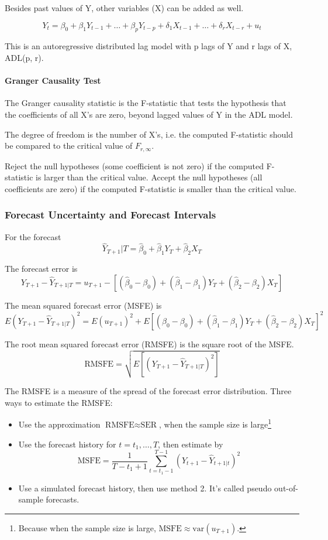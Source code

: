 \documentclass{article}
\begin{document}
Besides past values of Y, other variables (X) can be added as well.

\[
	Y_t = \beta_0 + \beta_1 Y_{t-1} + \ldots + \beta_p Y_{t-p} + \delta_1 X_{t-1} + \ldots + \delta_r X_{t-r} + u_t
\]

This is an autoregressive distributed lag model with p lags of Y and r lags of X, ADL(p, r).

\paragraph{Granger Causality Test}

The Granger causality statistic is the F-statistic that tests the hypothesis that the coefficients of all X's are zero,
beyond lagged values of Y in the ADL model.

The degree of freedom is the number of X's,
i.e. the computed F-statistic should be compared to the critical value of $F_{r, \infty}$.

Reject the null hypotheses (some coefficient is not zero) if the computed F-statistic is larger than the critical value.
Accept the null hypotheses (all coefficients are zero) if the computed F-statistic is smaller than the critical value.

\subsubsection{Forecast Uncertainty and Forecast Intervals}

For the forecast
\[
	\hat{Y}_{T+1}|T = \hat{\beta}_0 + \hat{\beta}_1 Y_T + \hat{\beta}_2 X_T
\]

The forecast error is
\[
	Y_{T+1} - \hat{Y}_{T+1|T} = u_{T+1} - \left[
		(\hat\beta_0 - \beta_0) + (\hat\beta_1 - \beta_1) Y_T + (\hat\beta_2 -\beta_2) X_T
	\right]
\]

The mean squared forecast error (MSFE) is
\[
	E(Y_{T+1} - \hat{Y}_{T+1|T})^2 = E(u_{T+1})^2 + E\left[
		(\hat\beta_0 - \beta_0) + (\hat\beta_1 - \beta_1) Y_T + (\hat\beta_2 -\beta_2) X_T
	\right]^2
\]



The root mean squared forecast error (RMSFE) is the square root of the MSFE.
\[
	\text{RMSFE} = \sqrt{
		E\left[
			(Y_{T+1} - \hat{Y} _{T+1 | T})^2
		\right]
	}
\]

The RMSFE is a measure of the spread of the forecast error distribution.
Three ways to estimate the RMSFE:
\begin{itemize}
	\item Use the approximation $\text{RMSFE} \approx \text{SER}$, when the sample size is large\footnote{
		Because when the sample size is large, $\text{MSFE} \approx \text{var}(u_{T+1})$.
	}
	\item Use the forecast history for $t=t_1, \ldots, T$, then estimate by
				\[
					\text{MSFE} = \dfrac{1}{T-t_1 + 1}
					\sum \limits_{t=t_1-1}^{T-1} \left(
						Y_{t+1} - \hat{Y}_{t+1|t}
					\right)^2
					\]
	\item Use a simulated forecast history, then use method 2. It's called pseudo out-of-sample forecasts.
\end{itemize}
\end{document}
